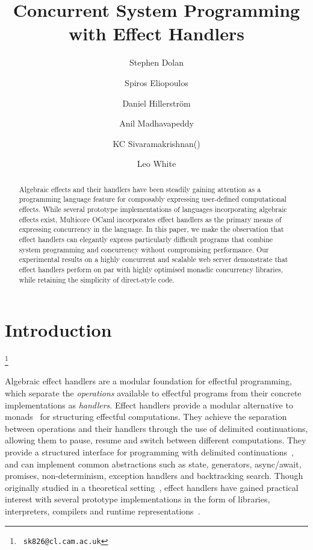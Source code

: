 \documentclass{llncs}
\newcommand\blfootnote[1]{%
	\begingroup
	\renewcommand\thefootnote{}\footnote{#1}%
	\addtocounter{footnote}{-1}%
	\endgroup
}
\begin{document}
\title{Concurrent System Programming with Effect Handlers}

\author{Stephen Dolan \and
				Spiros Eliopoulos \and
				Daniel Hillerström \and
				Anil Madhavapeddy \and
				KC Sivaramakrishnan(\Letter) \and
			  Leo White}


\maketitle

\begin{abstract}
	Algebraic effects and their handlers have been steadily gaining attention as
	a programming language feature for composably expressing user-defined
	computational effects. While several prototype implementations of languages
	incorporating algebraic effects exist, Multicore OCaml incorporates effect
	handlers as the primary means of expressing concurrency in the language. In
	this paper, we make the observation that effect handlers can elegantly
	express particularly difficult programs that combine system programming and
	concurrency without compromising performance. Our experimental results on a
	highly concurrent and scalable web server demonstrate that effect handlers
	perform on par with highly optimised monadic concurrency libraries, while
	retaining the simplicity of direct-style code.
\end{abstract}

\section{Introduction}

\blfootnote{\Letter~\texttt{sk826@cl.cam.ac.uk}}

Algebraic effect handlers are a modular foundation for effectful programming,
which separate the \emph{operations} available to effectful programs from their
concrete implementations as \emph{handlers}. Effect handlers provide a modular
alternative to monads~\citep*{Moggi91,Wadler92} for structuring effectful
computations. They achieve the separation between operations and their handlers
through the use of delimited continuations, allowing them to pause, resume and
switch between different computations. They provide a structured interface for
programming with delimited continuations~\citep*{ForsterKLP17}, and can
implement common abstractions such as state, generators, async/await, promises,
non-determinism, exception handlers and backtracking search. Though originally
studied in a theoretical setting~\cite{PlotkinP01,PlotkinP13}, effect handlers
have gained practical interest with several prototype implementations in the
form of libraries, interpreters, compilers and runtime
representations~\citep*{BauerP15,Brady13,DolanWSYM15,HillerstromL16,KammarLO13,KiselyovI15,Leijen17,LindleyMM17}.
\end{document}

